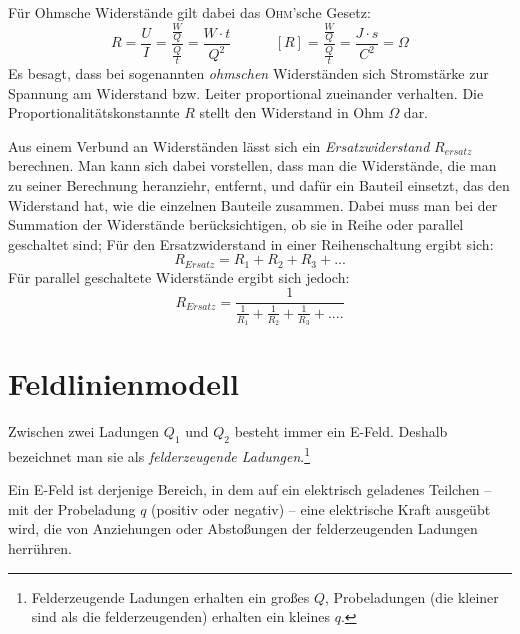 Für Ohmsche Widerstände gilt dabei das \textsc{Ohm}'sche Gesetz:
	\begin{equation}
	R = \frac{U}{I} = \frac{\frac{W}{Q}}{\frac{Q}{t}} = \frac{W \cdot t}{Q^2} ~~~~~~~~~~~~~~ [R] = \frac{\frac{W}{Q}}{\frac{Q}{t}} = \frac{J \cdot s}{C^2} = \Omega
	\label{def_R}
	\end{equation}
Es besagt, dass bei sogenannten \textit{ohmschen} Widerständen sich Stromstärke zur Spannung am Widerstand bzw. Leiter proportional zueinander verhalten. Die Proportionalitätskonstannte \(R\) stellt den Widerstand in Ohm \(\Omega\) dar. 

Aus einem Verbund an Widerständen lässt sich ein \textit{Ersatzwiderstand} \(R_{ersatz}\) berechnen. Man kann sich dabei vorstellen, dass man die Widerstände, die man zu seiner Berechnung heranziehr, entfernt, und dafür ein Bauteil einsetzt, das den Widerstand hat, wie die einzelnen Bauteile zusammen. Dabei muss man bei der Summation der Widerstände berücksichtigen, ob sie in Reihe oder parallel geschaltet sind; Für den Ersatzwiderstand in einer Reihenschaltung ergibt sich:
	\begin{equation}
	R_{Ersatz} = R_1 + R_2 + R_3 + ...
	\label{Rers_reihe}
	\end{equation}
Für parallel geschaltete Widerstände ergibt sich jedoch:
	\begin{equation}
	R_{Ersatz} = \frac{1}{\frac{1}{R_1} + \frac{1}{R_2} + \frac{1}{R_3} + ....}
	\label{Rers_parallel}
	\end{equation}	



		\chapter{Feldlinienmodell}

Zwischen zwei Ladungen \(Q_1\) und \(Q_2\) besteht immer ein E-Feld. Deshalb bezeichnet man sie als \textit{felderzeugende Ladungen}.\footnote{Felderzeugende Ladungen erhalten ein großes \(Q\), Probeladungen (die kleiner sind als die felderzeugenden) erhalten ein kleines \(q\).}

Ein E-Feld ist derjenige Bereich, in dem auf ein elektrisch geladenes Teilchen -- mit der Probeladung \(q\)  (positiv oder negativ) -- eine elektrische Kraft ausgeübt wird, die von Anziehungen oder Abstoßungen der felderzeugenden Ladungen herrühren.

